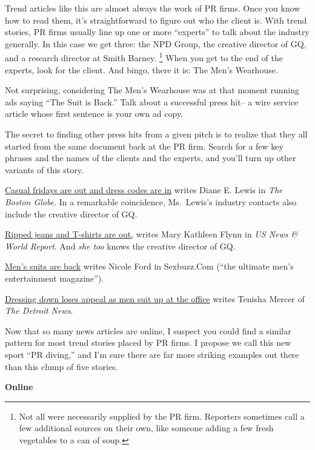 \documentclass[12pt]{book}
\begin{document}
Trend articles like this are almost always the work of PR firms. Once
you know how to read them, it's straightforward to figure out who the
client is. With trend stories, PR firms usually line up one or more
``experts'' to talk about the industry generally. In this case we get
three: the NPD Group, the creative director of GQ, and a research
director at Smith Barney. \footnote{Not all were necessarily supplied by the PR firm. Reporters
sometimes call a few additional sources on their own, like someone
adding a few fresh vegetables to a can of soup.} When you get to the
end of the experts, look for the client. And bingo, there it is: The
Men's Wearhouse.

Not surprising, considering The Men's Wearhouse was at that moment
running ads saying ``The Suit is Back.'' Talk about a successful press
hit-- a wire service article whose first sentence is your own ad copy.

The secret to finding other press hits from a given pitch is to realize
that they all started from the same document back at the PR firm. Search
for a few key phrases and the names of the clients and the experts, and
you'll turn up other variants of this story.

\href{http://bostonworks.boston.com/globe/articles/091904_suit.html}{Casual
fridays are out and dress codes are in} writes Diane E. Lewis in
\emph{The Boston Globe}. In a remarkable coincidence, Ms.~Lewis's
industry contacts also include the creative director of GQ.

\href{http://www.usnews.com/usnews/biztech/articles/041108/8eedress.htm}{Ripped
jeans and T-shirts are out,} writes Mary Kathleen Flynn in \emph{US News
\& World Report}. And \emph{she too} knows the creative director of GQ.

\href{http://www.sexbuzz.com/style/9,0004,00.shtml}{Men's suits are
back} writes Nicole Ford in Sexbuzz.Com (``the ultimate men's
entertainment magazine'').

\href{http://www.detnews.com/2004/careers/0405/28/b01-149207.htm}{Dressing
down loses appeal as men suit up at the office} writes Tenisha Mercer of
\emph{The Detroit News}.

Now that so many news articles are online, I suspect you could find a
similar pattern for most trend stories placed by PR firms. I propose we
call this new sport ``PR diving,'' and I'm sure there are far more
striking examples out there than this clump of five stories.

\textbf{Online}
\end{document}
